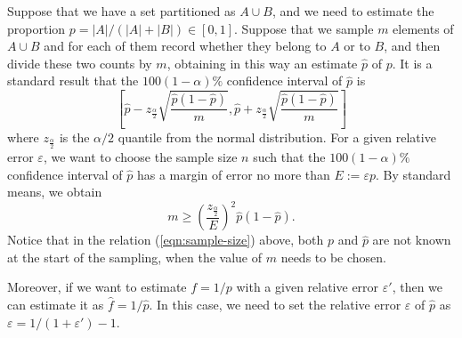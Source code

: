 \documentclass[a4paper,11pt]{article}
\newcommand{\kristoffer}[1]{{\color{red}{#1}}}
\newcommand{\alex}[1]{{\color{blue}{#1}}}
\renewcommand{\geq}{\geqslant}
\begin{document}
Suppose that we have a set partitioned as $A \cup B$, and we need to estimate the proportion $p = |A| / (|A| + |B|) \in [0,1]$. Suppose that we sample $m$ elements of $A \cup B$ and for each of them record whether they belong to $A$ or to $B$, and then divide these two counts by $m$, obtaining in this way an estimate $\hat{p}$ of $p$. It is a standard result that the $100(1-\alpha)\%$ confidence interval of $\hat{p}$ is
\[\left[\hat{p} - z_{\frac{\alpha}{2}}\sqrt{\frac{\hat{p}(1-\hat{p})}{m}} , \hat{p} + z_{\frac{\alpha}{2}}\sqrt{\frac{\hat{p}(1-\hat{p})}{m}}\right] \]
where $z_{\frac{\alpha}{2}}$ is the $\alpha/2$ quantile from the normal distribution. For a given relative error $\varepsilon$, we want to choose the sample size $n$ such that the $100(1-\alpha)\%$ confidence interval of $\hat{p}$ has a margin of error no more than $E := \varepsilon p$. By standard means, we obtain
\begin{equation}
	m \geq \left(\frac{z_{\frac{\alpha}{2}}}{E}\right)^2\hat{p}(1-\hat{p}).
	\label{eqn:sample-size}
\end{equation}
Notice that in the relation (\ref{eqn:sample-size}) above, both $p$ and $\hat{p}$ are not known at the start of the sampling, when the value of $m$ needs to be chosen. 

\alex{In our case, we choose $p$ and $\hat{p}$ ...  }

Moreover, if we want to estimate $f = 1/p$ with a given relative error $\varepsilon'$, then we can estimate it as $\hat{f} = 1/\hat{p}$. In this case, we need to set the relative error $\varepsilon$ of $\hat{p}$ as $\varepsilon = 1/(1+\varepsilon') - 1$. 
\kristoffer{I stop here with the note that I have to clarify the last part in this section (i.e f=1/p) a bit. Also, we need to illustrate how it works in practice (inital estimate, then updating sample size as we go for a fixed epsilon= say 0.05)}




\end{document}
